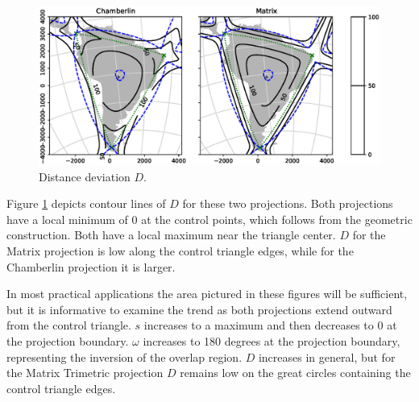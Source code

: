 \documentclass[]{interact}
\begin{document}
\begin{figure}%
  \includegraphics[width=\textwidth]{SA_Wall_Map_distance}
  \caption{Distance deviation $D$.}
  \label{fig:distance}
\end{figure}

Figure \ref{fig:distance} depicts contour lines of $D$ for these two
projections. Both projections have a local minimum of 0 at the control points,
which follows from the geometric construction. Both have a local maximum near
the triangle center. $D$ for the Matrix projection is low along the control
triangle edges, while for the Chamberlin projection it is larger.

In most practical applications the area pictured in these figures will be
sufficient, but it is informative to examine the trend as both projections
extend outward from the control triangle. $s$ increases to a maximum and then
decreases to 0 at the projection boundary. $\omega$ increases to 180 degrees at
the projection boundary, representing the inversion of the overlap region. $D$
increases in general, but for the Matrix Trimetric projection
$D$ remains low on the great circles containing the control triangle edges.
\end{document}
